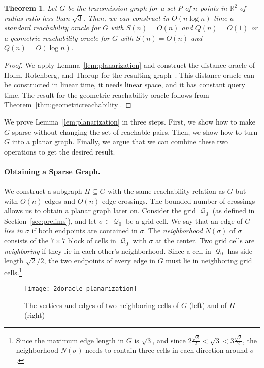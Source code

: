 \documentclass[11pt,a4paper]{paper}
\newtheorem{theorem}{Theorem}[section]
\newcommand{\mathset}[1]{\ensuremath {\mathbb {#1}}}
\newcommand{\R}{\mathset{R}}
\DeclareMathOperator{\Q}{\mathcal{Q}}
\begin{document}
\begin{theorem}
\label{thm:2doraclesmall}
Let $G$ be the transmission graph for a set $P$ of
$n$ points in $\R^2$ of radius ratio  less than
$\sqrt{3}$.
Then, we can construct in
$O(n\log n)$ time a standard reachability oracle for $G$ with $S(n) = O(n)$
and $Q(n) = O(1)$ or a geometric reachability oracle for $G$ with $S(n) =
O(n)$ and $Q(n) = O(\log n)$.
\end{theorem}
\begin{proof}
We apply Lemma~\ref{lem:planarization}
and construct the distance oracle of Holm, Rotenberg, and Thorup for
the resulting graph~\cite{Holm2015}.
This distance oracle can be constructed in linear time, it needs
linear space, and it has constant query time. The result for the geometric
reachability oracle follows from Theorem~\ref{thm:geometricreachability}.
\end{proof}

We prove
Lemma~\ref{lem:planarization} in three steps. First, we show how to
make $G$ sparse without changing the set of
reachable  pairs. Then, we show how to turn $G$ into a planar graph.
Finally, we argue that we can combine these two operations to
get the desired result.

\paragraph*{Obtaining a Sparse Graph.}
We construct a subgraph
$H \subseteq G$ with the same reachability relation as $G$ but with
$O(n)$ edges and $O(n)$ edge crossings.
The bounded number of crossings allows us to obtain a planar
graph later on.
Consider the grid $\Q_0$ (as defined in Section~\ref{sec:prelims}), 
and let $\sigma \in \Q_0$ be a grid cell.
We say that an edge  of $G$ \emph{lies in}
$\sigma$ if both endpoints are contained in
$\sigma$.
The \emph{neighborhood} $N(\sigma)$ of $\sigma$ consists of
the $7 \times 7$ block of cells in $\Q_0$ with $\sigma$ at the center.
Two grid cells are \emph{neighboring} if they lie in each
other's neighborhood.
Since a cell in $\Q_0$ has side length $\sqrt{2}/2$,
the two endpoints of every edge in $G$ must lie in neighboring
grid cells.\footnote{Since the maximum edge length in $G$ is $\sqrt{3}$,
and since $2 \frac{\sqrt{2}}{2} < \sqrt{3} < 3 \frac{\sqrt{2}}{2}$,
the neighborhood $N(\sigma)$ needs to contain three cells in each
direction around $\sigma$.}

\begin{figure}[htb]
\centering
\texttt{[image: 2doracle-planarization]}
\caption{The vertices and edges of two neighboring cells of $G$ (left) and
 of $H$ (right)}

 \label{fig:planarization}
\end{figure}
\end{document}
